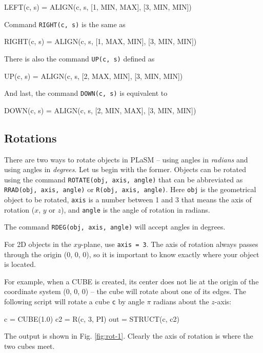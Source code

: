 \begin{bluecode}
LEFT(c, s) = ALIGN(c, s, [1, MIN, MAX], [3, MIN, MIN])
\end{bluecode}
Command {\tt RIGHT(c, s)} is the same as

\begin{bluecode}
RIGHT(c, s) = ALIGN(c, s, [1, MAX, MIN], [3, MIN, MIN])
\end{bluecode}
There is also the command {\tt UP(c, s)} defined as

\begin{bluecode}
UP(c, s) = ALIGN(c, s, [2, MAX, MIN], [3, MIN, MIN])
\end{bluecode}
And last, the command {\tt DOWN(c, s)} is equivalent to

\begin{bluecode}
DOWN(c, s) = ALIGN(c, s, [2, MIN, MAX], [3, MIN, MIN])
\end{bluecode}

\subsection{Rotations}

There are two ways to rotate objects in PLaSM -- using angles in 
{\em radians} and using angles in {\em degrees}. Let us begin with the former.
Objects can be rotated using the command {\tt ROTATE(obj, axis, angle)} 
that can be abbreviated as {\tt RRAD(obj, axis, angle)} or {\tt R(obj, axis, angle)}. 
Here {\tt obj} is the geometrical object to be rotated, {\tt axis} is a number between 
1 and 3 that means the axis of rotation ($x$, $y$ or $z$), and {\tt angle} is the 
angle of rotation in radians. 

The command {\tt RDEG(obj, axis, angle)} will accept 
angles in degrees.

For 2D objects in the $xy$-plane, use {\tt axis = 3}. The axis of rotation 
always passes through the origin (0, 0, 0), so it is important 
to know exactly where your object is located. 

For example, when a CUBE is created, its center does not lie
at the origin of the coordinate system (0, 0, 0) -- the cube will 
rotate about one of its edges. The following script will rotate 
a cube {\tt c} by angle $\pi$ radians about the $z$-axis: 

\begin{bluecode}
c = CUBE(1.0)
c2 = R(c, 3, PI)
out = STRUCT(c, c2)
\end{bluecode}
The output is shown in Fig. \ref{fig:rot-1}. Clearly the axis of 
rotation is where the two cubes meet.
\newpage

